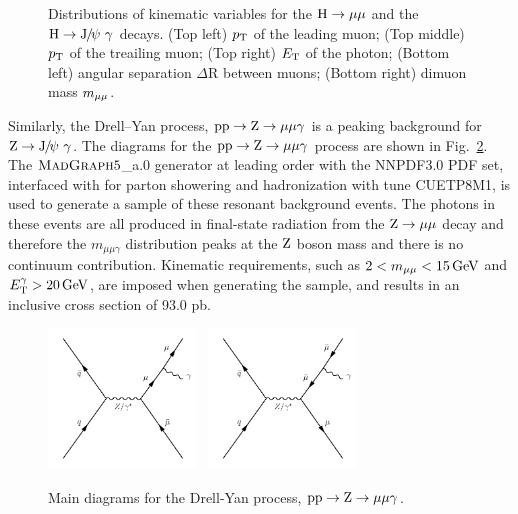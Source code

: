 \begin{figure}[p]
\begin{center}
    \caption{Distributions of kinematic variables for the $\mathrm{H}\to\mu\mu$ and the $\mathrm{H}\to{\mathrm{J}\hspace{-.08em}/\hspace{-.14em}\psi}\ \gamma$ decays. (Top left) $p_{\mathrm{T}}$ of the leading muon; (Top middle) $p_{\mathrm{T}}$ of the treailing muon; (Top right) $E_{\mathrm{T}}$ of the photon; (Bottom left) angular separation $\Delta \text{R}$ between muons; (Bottom right) dimuon mass $m_{\mu\mu}$.  \label{fig:GenLevel_Hmumu}}  
  \end{center}
\end{figure} 

Similarly, the Drell--Yan process, $\mathrm{p}\mathrm{p}\to\mathrm{Z}\to\mu\mu\gamma$ is a peaking background for $\mathrm{Z} \to{\mathrm{J}\hspace{-.08em}/\hspace{-.14em}\psi}\ \gamma$. 
The diagrams for the $\mathrm{p}\mathrm{p}\to\mathrm{Z}\to\mu\mu\gamma$ process are shown in Fig.~\ref{fig:FeynmanDiagrams_Zmmg}.
The $\textsc{MadGraph} 5$\_a.0 generator at leading order with the NNPDF3.0 PDF set, interfaced with  for parton showering and hadronization with tune CUETP8M1, is used to generate a sample of these resonant background events. The photons in these events are all produced in final-state radiation from the $\mathrm{Z}\to\mu\mu$ decay and therefore the $m_{\mu\mu\gamma}$ distribution peaks at the $\mathrm{Z}$ boson mass and there is no continuum contribution. Kinematic requirements, such as $2<m_{\mu\mu}<15\,\text{Ge\hspace{-.08em}V}$ and $E_{\mathrm{T}}^{\gamma}>20\,\text{Ge\hspace{-.08em}V}$, are imposed when generating the sample, and results in an inclusive cross section of 93.0 pb.
\begin{figure}[!ht]
  \begin{center}  
    \includegraphics[width=0.35\textwidth]{Fig/Zmmg1}~
    \includegraphics[width=0.35\textwidth]{Fig/Zmmg2}
    \caption{Main diagrams for the Drell-Yan process, $\mathrm{p}\mathrm{p}\to\mathrm{Z}\to\mu\mu\gamma$.\label{fig:FeynmanDiagrams_Zmmg}}  
  \end{center}
\end{figure}
